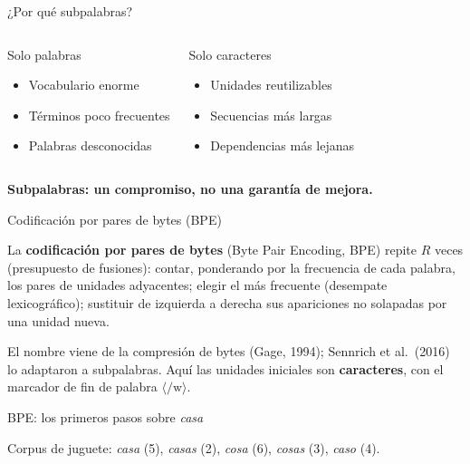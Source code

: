 \documentclass[aspectratio=169,10pt]{beamer}
\begin{document}
\begin{frame}{¿Por qué subpalabras?}
\begin{columns}[T]\begin{block}{Solo palabras}\begin{itemize}\item Vocabulario enorme\item Términos poco frecuentes\item Palabras desconocidas\end{itemize}\end{block}
\begin{block}{Solo caracteres}\begin{itemize}\item Unidades reutilizables\item Secuencias más largas\item Dependencias más lejanas\end{itemize}\end{block}\end{columns}
\vspace{4mm}\centering\bfseries Subpalabras: un compromiso, no una garantía de mejora.
\end{frame}

\begin{frame}{Codificación por pares de bytes (BPE)}
\begin{definition}
La \textbf{codificación por pares de bytes} (Byte Pair Encoding, BPE) repite $R$
veces (presupuesto de fusiones): contar, ponderando por la frecuencia de cada
palabra, los pares de unidades adyacentes; elegir el más frecuente (desempate
lexicográfico); sustituir de izquierda a derecha sus apariciones no solapadas por
una unidad nueva.
\end{definition}
\small El nombre viene de la compresión de bytes (Gage, 1994); Sennrich et al.\ (2016) lo
adaptaron a subpalabras. Aquí las unidades iniciales son \textbf{caracteres}, con el
marcador de fin de palabra $\langle/\mathrm w\rangle$.
\end{frame}

\begin{frame}{BPE: los primeros pasos sobre \emph{casa}}
\centering{}
\vspace{5mm}\small Corpus de juguete: \emph{casa} (5), \emph{casas} (2), \emph{cosa} (6), \emph{cosas} (3), \emph{caso} (4).
\end{frame}
\end{document}
